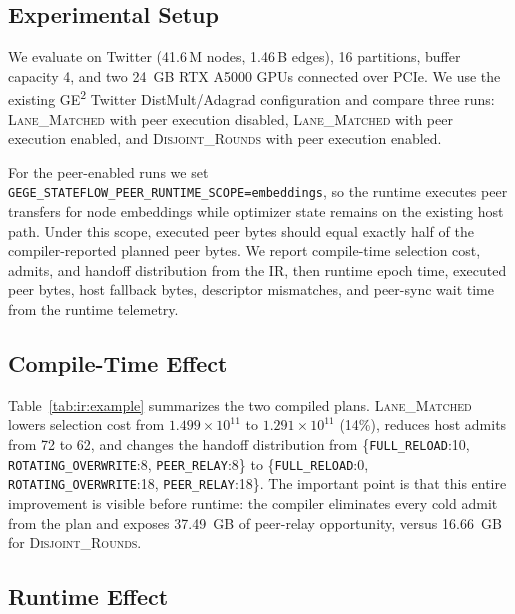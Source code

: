 
\subsection{Experimental Setup}

We evaluate on Twitter (41.6\,M nodes, 1.46\,B edges), 16 partitions,
buffer capacity 4, and two \SI{24}{GB} RTX A5000 GPUs connected over
PCIe. We use the existing GE\textsuperscript{2} Twitter
DistMult/Adagrad configuration and compare three runs:
\textsc{Lane\_Matched} with peer execution disabled,
\textsc{Lane\_Matched} with peer execution enabled, and
\textsc{Disjoint\_Rounds} with peer execution enabled.

For the peer-enabled runs we set
\texttt{GEGE\_STATEFLOW\_PEER\_RUNTIME\_SCOPE=embeddings}, so the
runtime executes peer transfers for node embeddings while optimizer
state remains on the existing host path. Under this scope, executed
peer bytes should equal exactly half of the compiler-reported planned
peer bytes. We report compile-time selection cost, admits, and handoff
distribution from the IR, then runtime epoch time, executed peer
bytes, host fallback bytes, descriptor mismatches, and peer-sync wait
time from the runtime telemetry.

\subsection{Compile-Time Effect}

Table~\ref{tab:ir:example} summarizes the two compiled plans.
\textsc{Lane\_Matched} lowers selection cost from
$1.499 \times 10^{11}$ to $1.291 \times 10^{11}$ (14\%), reduces host
admits from 72 to 62, and changes the handoff distribution from
\{\texttt{FULL\_RELOAD}:10, \texttt{ROTATING\_OVERWRITE}:8,
\texttt{PEER\_RELAY}:8\} to
\{\texttt{FULL\_RELOAD}:0, \texttt{ROTATING\_OVERWRITE}:18,
\texttt{PEER\_RELAY}:18\}. The important point is that this entire
improvement is visible before runtime: the compiler eliminates every
cold admit from the plan and exposes \SI{37.49}{GB} of peer-relay
opportunity, versus \SI{16.66}{GB} for \textsc{Disjoint\_Rounds}.

\subsection{Runtime Effect}

